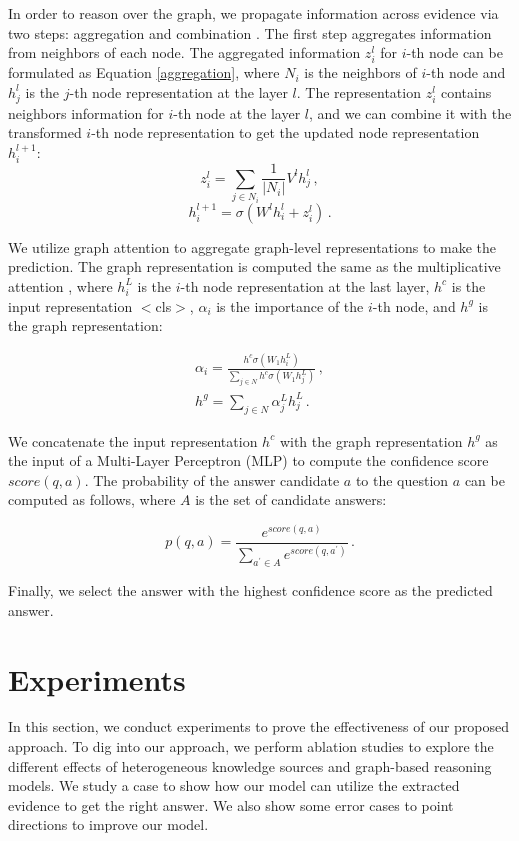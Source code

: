 \documentclass[letterpaper]{article} \usepackage{aaai20}  \usepackage{times}  \usepackage{helvet} \usepackage{courier}  \usepackage[hyphens]{url}  \usepackage{graphicx} \urlstyle{rm} \def\UrlFont{\rm}  \usepackage{graphicx}  \frenchspacing  \setlength{\pdfpagewidth}{8.5in}  \setlength{\pdfpageheight}{11in}
\begin{document}
In order to reason over the graph, we propagate information across evidence via two steps: aggregation and combination \cite{hamilton2017inductive}. The first step aggregates information from neighbors of each node. The aggregated information $z^{l}_i$ for $i$-th node can be formulated as Equation \ref{aggregation}, where $N_i$ is the neighbors of $i$-th node and $h^{l}_j$ is the $j$-th node representation at the layer $l$. The representation $z^{l}_i$ contains neighbors information for $i$-th node at the layer $l$, and we can combine it with the transformed $i$-th node representation to get the updated node representation $h^{l+1}_i$:
\begin{equation}\label{aggregation}
z^{l}_i=\sum_{j\in N_i}\frac{1}{|N_i|}V^{l}h^{l}_j \,,
\end{equation} 
\begin{equation}\label{GCN}
h^{l+1}_i=\sigma(W^{l}h^{l}_i+z^{l}_i) \,.
\end{equation} 

We utilize graph attention to aggregate graph-level representations to make the prediction.  The graph representation is computed the same as the multiplicative attention \cite{luong2015effective}, where $h^{L}_i$ is the $i$-th node representation at the last layer, $h^c$ is the input representation $<$cls$>$, $\alpha_{i}$ is the importance of the $i$-th node, and $h^g$ is the graph representation: 

\begin{gather}
	\alpha_{i}=\frac{h^c\sigma(W_1h^{L}_i)}{\sum_{j\in N}h^c\sigma(W_1h^{L}_j)} \,, \\
	h^g=\sum_{j\in N}\alpha_{j}^{L}h^{L}_j  \,.
\end{gather}

We concatenate the input representation $h^c$ with the graph representation $h^g$ as the input of a Multi-Layer Perceptron (MLP) to compute the confidence score $score{(q,a)}$. The probability of the answer candidate $a$ to the question $a$ can be computed as follows, where $A$ is the set of candidate answers: 

\begin{equation}
p(q,a)=\frac{e^{score{(q,a)}}}{\sum_{a^{'} \in A}e^{score{(q,a^{'})}}} \,.
\end{equation}

Finally, we select the answer with the highest confidence score as the predicted answer.

\section{Experiments}
In this section, we conduct experiments to prove the effectiveness of our proposed approach. 
To dig into our approach, we perform ablation studies to explore the different effects of heterogeneous knowledge sources and graph-based reasoning models.
We study a case to show how our model can utilize the extracted evidence to get the right answer.
We also show some error cases to point directions to improve our model.
\end{document}
